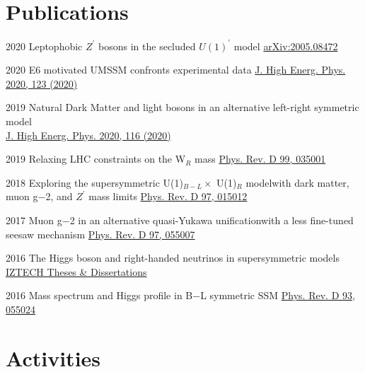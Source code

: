 \documentclass[]{friggeri-cv}
\begin{document}
\section{Publications}
\begin{entrylist}
	\entryp
	{2020}
	{Leptophobic $Z^\prime$ bosons in the secluded $U(1)^\prime$ model}
	{\href{https://arxiv.org/abs/2005.08472}{arXiv:2005.08472}} 	
	
	\entryp
	{2020}
	{E6 motivated UMSSM confronts experimental data}
	{\href{https://doi.org/10.1007/JHEP05(2020)123}{J. High Energ. Phys. 2020, 123 (2020)}} 	
	
	\entryp
	{2019}
	{Natural Dark Matter and light bosons in an alternative left-right symmetric model \\}
	{\href{https://doi.org/10.1007/JHEP04(2020)116}{J. High Energ. Phys. 2020, 116 (2020)}} 
	
	\entryp
	{2019}
	{Relaxing LHC constraints on the W$_R$ mass}
	{\href{https://journals.aps.org/prd/abstract/10.1103/PhysRevD.99.035001}{Phys. Rev. D 99, 035001}} 
	
	\entryLongTitle
	{2018}
	{Exploring the supersymmetric U(1)$_{B-L} \times$ U(1)$_R$ model}{with dark matter, muon g−2, and $Z^\prime$ mass limits}
	{\href{https://journals.aps.org/prd/abstract/10.1103/PhysRevD.97.015012}{Phys. Rev. D 97, 015012}} 
	
	\entryLongTitle
	{2017}
	{Muon g−2 in an alternative quasi-Yukawa unification}{with a less fine-tuned seesaw mechanism}
	{\href{http://journals.aps.org/prd/abstract/10.1103/PhysRevD.97.055007}{Phys. Rev. D 97, 055007}} 
	
	\entryp
	{2016}
	{The Higgs boson and right-handed neutrinos in supersymmetric models \\}
	{\href{http://openaccess.iyte.edu.tr/xmlui/handle/11147/2842}{IZTECH Theses \& Dissertations}} 
	
	\entryp
	{2016}
	{Mass spectrum and Higgs profile in B−L symmetric SSM}
	{\href{http://journals.aps.org/prd/abstract/10.1103/PhysRevD.93.055024}{Phys. Rev. D 93, 055024}} 
	
\end{entrylist}

\section{Activities}
\end{document}
